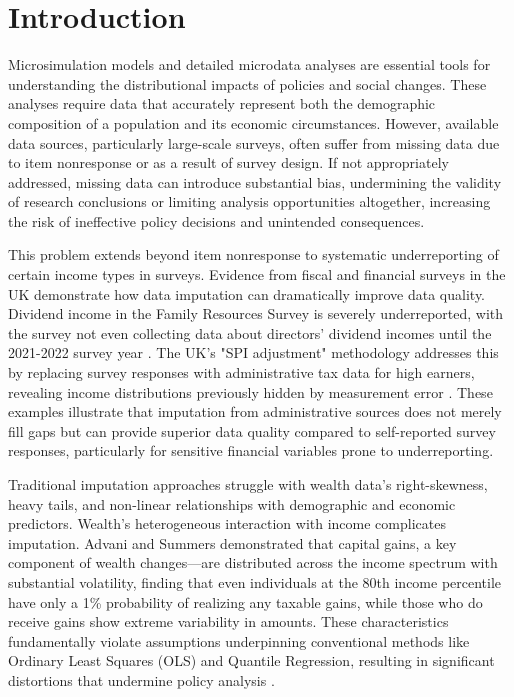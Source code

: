 \section{Introduction}

Microsimulation models and detailed microdata analyses are essential tools for understanding the distributional impacts of policies and social changes. These analyses require data that accurately represent both the demographic composition of a population and its economic circumstances. However, available data sources, particularly large-scale surveys, often suffer from missing data due to item nonresponse \citep{dempster1983introduction} or as a result of survey design. If not appropriately addressed, missing data can introduce substantial bias, undermining the validity of research conclusions \citep{graham2009missing} or limiting analysis opportunities altogether, increasing the risk of ineffective policy decisions and unintended consequences.

This problem extends beyond item nonresponse to systematic underreporting of certain income types in surveys. Evidence from fiscal and financial surveys in the UK demonstrate how data imputation can dramatically improve data quality. Dividend income in the Family Resources Survey is severely underreported, with the survey not even collecting data about directors' dividend incomes until the 2021-2022 survey year \citep{dwp2023frs}. The UK's "SPI adjustment" methodology addresses this by replacing survey responses with administrative tax data for high earners, revealing income distributions previously hidden by measurement error \citep{advani2023measuring}. These examples illustrate that imputation from administrative sources does not merely fill gaps but can provide superior data quality compared to self-reported survey responses, particularly for sensitive financial variables prone to underreporting.

Traditional imputation approaches struggle with wealth data's right-skewness, heavy tails, and non-linear relationships with demographic and economic predictors. Wealth's heterogeneous interaction with income complicates imputation. Advani and Summers \citep{advani2020capital} demonstrated that capital gains, a key component of wealth changes—are distributed across the income spectrum with substantial volatility, finding that even individuals at the 80th income percentile have only a 1\% probability of realizing any taxable gains, while those who do receive gains show extreme variability in amounts. These characteristics fundamentally violate assumptions underpinning conventional methods like Ordinary Least Squares (OLS) and Quantile Regression, resulting in significant distortions that undermine policy analysis \citep{meinshausen2006quantile}.

